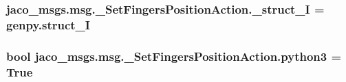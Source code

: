 \subsubsection[{\texorpdfstring{\+\_\+struct\+\_\+I}{_struct_I}}]{\setlength{\rightskip}{0pt plus 5cm}jaco\+\_\+msgs.\+msg.\+\_\+\+Set\+Fingers\+Position\+Action.\+\_\+struct\+\_\+I = genpy.\+struct\+\_\+I\hspace{0.3cm}{\ttfamily [private]}}\hypertarget{namespacejaco__msgs_1_1msg_1_1__SetFingersPositionAction_ac588686576e023e5eff8543b94f1eaab}{}\label{namespacejaco__msgs_1_1msg_1_1__SetFingersPositionAction_ac588686576e023e5eff8543b94f1eaab}
\subsubsection[{\texorpdfstring{python3}{python3}}]{\setlength{\rightskip}{0pt plus 5cm}bool jaco\+\_\+msgs.\+msg.\+\_\+\+Set\+Fingers\+Position\+Action.\+python3 = True}\hypertarget{namespacejaco__msgs_1_1msg_1_1__SetFingersPositionAction_a575384c5095af8e820fdb8f3c5965102}{}\label{namespacejaco__msgs_1_1msg_1_1__SetFingersPositionAction_a575384c5095af8e820fdb8f3c5965102}

